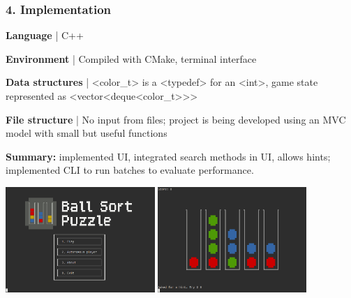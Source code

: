 \documentclass{beamer}
\def\texttt#1{<#1>}
\begin{document}
\begin{frame}
\frametitle{4. Implementation}

\small

\vspace{-0.5em}

\setlength{\multicolsep}{6.0pt plus 2.0pt minus 1.5pt}%
\begin{multicols}{2}

  \textbf{Language} | C++

  \textbf{Environment} | Compiled with CMake, terminal interface

  \textbf{Data structures} | \texttt{color\_t} is a \texttt{typedef} for an \texttt{int}, game state represented as \texttt{vector<deque<color\_t>>}

  \textbf{File structure} | No input from files; project is being developed using an MVC model with small but useful functions

\end{multicols}

\textbf{Summary:} implemented UI, integrated search methods in UI, allows hints; implemented CLI to run batches to evaluate performance.

\begin{center}
  \includegraphics[height=40mm]{img/main-menu.png}
  \includegraphics[height=40mm]{img/game-interface.png}
\end{center}

\end{frame}
\end{document}
